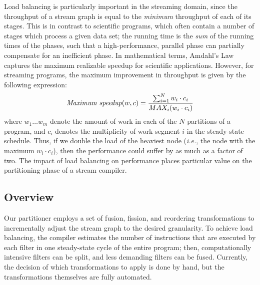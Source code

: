 Load balancing is particularly important in the streaming domain,
since the throughput of a stream graph is equal to the {\it minimum}
throughput of each of its stages.  This is in contrast to scientific
programs, which often contain a number of stages which process a given
data set; the running time is the {\it sum} of the running times of
the phases, such that a high-performance, parallel phase can partially
compensate for an inefficient phase.  In mathematical terms, Amdahl's
Law captures the maximum realizable speedup for scientific
applications.  However, for streaming programs, the maximum
improvement in throughput is given by the following expression:
\begin{align*}
\mbox{\it Maximum speedup}(w, c) = \frac{\sum_{i=1}^N{w_i \cdot c_i}}{MAX_i(w_i \cdot c_i)}
\end{align*}
where $w_1 \dots w_m$ denote the amount of work in each of the $N$
partitions of a program, and $c_i$ denotes the multiplicity of work
segment $i$ in the steady-state schedule.  Thus, if we double the load
of the heaviest node ({\it i.e.}, the node with the maximum $w_i \cdot
c_i$), then the performance could suffer by as much as a factor of
two.  The impact of load balancing on performance places particular
value on the partitioning phase of a stream compiler.

\subsection{Overview}

Our partitioner employs a set of fusion, fission, and reordering
transformations to incrementally adjust the stream graph to the
desired granularity.  To achieve load balancing, the compiler
estimates the number of instructions that are executed by each filter
in one steady-state cycle of the entire program; then, computationally
intensive filters can be split, and less demanding filters can be
fused.  Currently, the decision of which transformations to apply is
done by hand, but the transformations themselves are fully automated.


